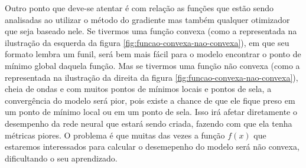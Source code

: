 Outro ponto que deve-se atentar é com relação as funções que estão sendo analisadas ao utilizar o método do gradiente mas também qualquer otimizador que seja baseado nele. Se tivermos uma função convexa (como a representada na ilustração da esquerda da figura \ref{fig:funcao-convexa-nao-convexa}), em que seu formato lembra um funil, será bem mais fácil para o modelo encontrar o ponto de mínimo global daquela função. Mas se tivermos uma função não convexa (como a representada na ilustração da direita da figura \ref{fig:funcao-convexa-nao-convexa}), cheia de ondas e com muitos pontos de mínimos locais e pontos de sela, a convergência do modelo será pior, pois existe a chance de que ele fique preso em um ponto de mínimo local ou em um ponto de sela. Isso irá afetar diretamente o desempenho da rede neural que estará sendo criada, fazendo com que ela tenha métricas piores. O problema é que muitas das vezes a função $f(x)$ que estaremos interessados para calcular o desemepenho do modelo será não convexa, dificultando o seu aprendizado.

